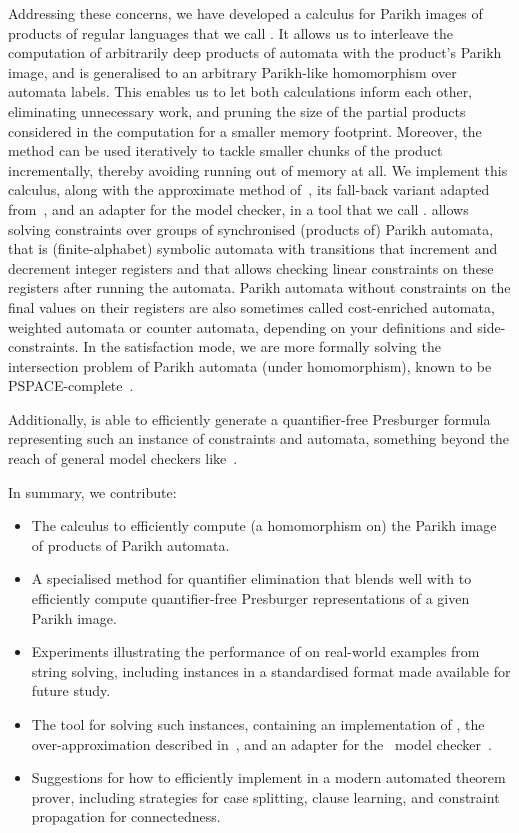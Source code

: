 \documentclass[acmsmall,review,anonymous,screen]{acmart}\settopmatter{printfolios=true,printccs=false,printacmref=true}
\theoremstyle{definition}
\begin{document}
Addressing these concerns, we have developed a calculus for Parikh images of
products of regular languages that we call \Calculus{}. It allows us to
interleave the computation of arbitrarily deep products of automata with the
product's Parikh image, and is generalised to an arbitrary Parikh-like
homomorphism over automata labels. This enables us to let both calculations
inform each other, eliminating unnecessary work, and pruning the size of the
partial products considered in the computation for a smaller memory footprint.
Moreover, the method can be used iteratively to tackle smaller chunks of the
product incrementally, thereby avoiding running out of memory at all. We
implement this calculus, along with the approximate method
of~\cite{approximate-parikh}, its fall-back variant adapted
from~\cite{generate-parikh-image}, and an adapter for the \Nuxmv{} model
checker, in a tool that we call \Catra{}. \Catra{} allows solving constraints
over groups of synchronised (products of) Parikh automata, that is
(finite-alphabet) symbolic automata with transitions that increment and
decrement integer registers and that allows checking linear constraints on these
registers after running the automata. Parikh automata without constraints on the
final values on their registers are also sometimes called cost-enriched
automata, weighted automata or counter automata, depending on your definitions
and side-constraints. In the satisfaction mode, we are more formally solving the
intersection problem of Parikh automata (under homomorphism), known to be
PSPACE-complete~\cite{graph-queries}.

Additionally, \Catra{} is able to efficiently generate a quantifier-free
Presburger formula representing such an instance of constraints and automata,
something beyond the reach of general model checkers like~\Nuxmv.

In summary, we contribute:
\begin{itemize}
\item The \Calculus{} calculus to efficiently compute (a homomorphism on) the
Parikh image of products of Parikh automata.
\item A specialised method for quantifier elimination that blends well with \Calculus{} to efficiently compute quantifier-free Presburger representations of a given Parikh image.
\item Experiments illustrating the performance of \Calculus{} on real-world examples from string solving, including \NrBenchmarks{} instances in a standardised format made available for future study.
\item The \Catra{} tool for solving such instances, containing an implementation of \Calculus{}, the over-approximation described in~\cite{approximate-parikh}, and an adapter for the~\Nuxmv{} model checker~\cite{nuxmv}.
\item Suggestions for how to efficiently implement \Calculus{} in a modern automated theorem prover, including strategies for case splitting, clause learning, and constraint propagation for connectedness.
\end{itemize}
\end{document}
